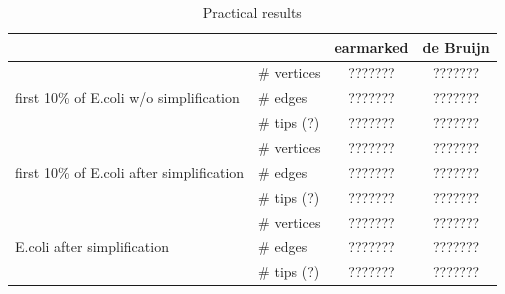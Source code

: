 \documentclass[17pt]{extarticle}
\theoremstyle{definition}
\begin{document}
\begin{multicols}{2}
\begin{table}
\begin{center}
\begin{tabular}{llcc}
\toprule
& & earmarked & de Bruijn\\

\midrule
\multirow{3}{*}{first 10\% of E.coli w/o simplification} & \# vertices & ??????? & ???????\\
\cmidrule(r){2-4}
& \# edges & ??????? & ???????\\
\cmidrule(r){2-4}
& \# tips (?) & ??????? & ???????\\

\midrule
\multirow{3}{*}{first 10\% of E.coli after simplification} & \# vertices & ??????? & ???????\\
\cmidrule(r){2-4}
& \# edges & ??????? & ???????\\
\cmidrule(r){2-4}
& \# tips (?) & ??????? & ???????\\

\midrule
\multirow{3}{*}{E.coli after simplification} & \# vertices & ??????? & ???????\\
\cmidrule(r){2-4}
& \# edges & ??????? & ???????\\
\cmidrule(r){2-4}
& \# tips (?) & ??????? & ???????\\

\bottomrule
\end{tabular}
\caption{Practical results}\label{table:practical}
\end{center}
\end{table}

\end{multicols}
\end{document}
